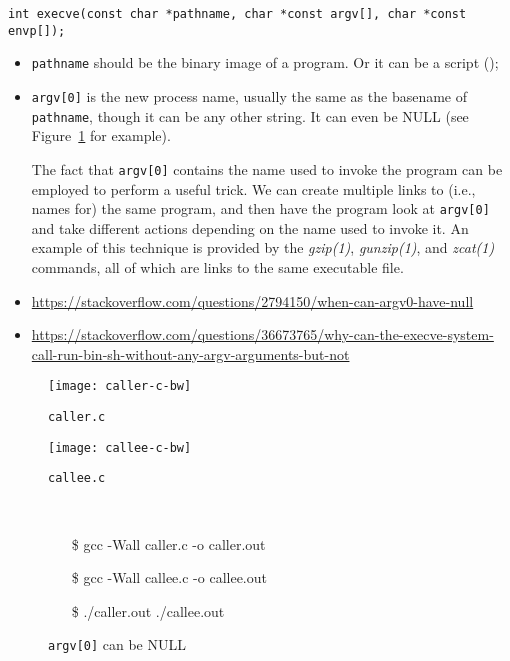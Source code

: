 \texttt{int execve(const char *pathname, char *const argv[], char *const envp[]);}
\begin{itemize}
\item \texttt{pathname} should be the binary image of a program. Or it can be a script
  ();
\item \texttt{argv[0]} is the new process name, usually the same as the basename of
  \texttt{pathname}, though it can be any other string. It can even be NULL (see
  Figure~\ref{fig:argv0} for example).

  The fact that \texttt{argv[0]} contains the name used to invoke the program can be
  employed to perform a useful trick. We can create multiple links to (i.e., names for)
  the same program, and then have the program look at \texttt{argv[0]} and take different
  actions depending on the name used to invoke it. An example of this technique is
  provided by the \emph{gzip(1)}, \emph{gunzip(1)}, and \emph{zcat(1)} commands, all of
  which are links to the same executable
  file. 
\item \url{https://stackoverflow.com/questions/2794150/when-can-argv0-have-null}
\item \url{https://stackoverflow.com/questions/36673765/why-can-the-execve-system-call-run-bin-sh-without-any-argv-arguments-but-not}
\end{itemize}

\begin{figure}
  \centering
  \begin{minipage}{.4\linewidth}
    \begin{center}
      \texttt{[image: caller-c-bw]}
      \caption{\texttt{caller.c}}
    \end{center}
  \end{minipage}\qquad
  \begin{minipage}{.4\linewidth}
    \begin{center}
      \texttt{[image: callee-c-bw]}
      \caption{\texttt{callee.c}}
    \end{center}
  \end{minipage}\\[1em]
  \ttfamily
  \begin{itemize}
  \item[\$] gcc -Wall caller.c -o caller.out
  \item[\$] gcc -Wall callee.c -o callee.out
  \item[\$] ./caller.out ./callee.out
  \end{itemize}
  \caption{\texttt{argv[0]} can be NULL}
  \label{fig:argv0}
\end{figure}

